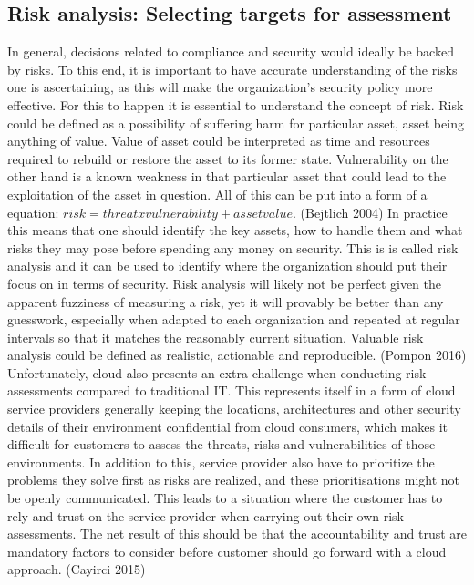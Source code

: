 \documentclass{article}
\begin{document}
\subsection{Risk analysis: Selecting targets for assessment}
In general, decisions related to compliance and security would ideally be backed by risks. To this end, it is important to have accurate understanding of the risks one is ascertaining, as this will make the organization's security policy more effective.
For this to happen it is essential to understand the concept of risk. Risk could be defined as a possibility of suffering harm for particular asset, asset being anything of value. Value of asset could be interpreted as time and resources required to rebuild or restore the asset to its former state. Vulnerability on the other hand is a known weakness in that particular asset that could lead to the exploitation of the asset in question. All of this can be put into a form of a equation: $risk = threat x vulnerability + asset value$. (Bejtlich 2004)
In practice this means that one should identify the key assets, how to handle them and what risks they may pose before spending any money on security. This is is called risk analysis and it can be used to identify where the organization should put their focus on in terms of security. Risk analysis will likely not be perfect given the apparent fuzziness of measuring a risk, yet it will provably be better than any guesswork, especially when adapted to each organization and repeated at regular intervals so that it matches the reasonably current situation. Valuable risk analysis could be defined as realistic, actionable and reproducible. (Pompon 2016)
Unfortunately, cloud also presents an extra challenge when conducting risk assessments compared to traditional IT. This represents itself in a form of cloud service providers generally keeping the locations, architectures and other security details of their environment confidential from cloud consumers, which makes it difficult for customers to assess the threats, risks and vulnerabilities of those environments. In addition to this, service provider also have to prioritize the problems they solve first as risks are realized, and these prioritisations might not be openly communicated. This leads to a situation where the customer has to rely and trust on the service provider when carrying out their own risk assessments. The net result of this should be that the accountability and trust are mandatory factors to consider before customer should go forward with a cloud approach. (Cayirci 2015)
\par
\end{document}
